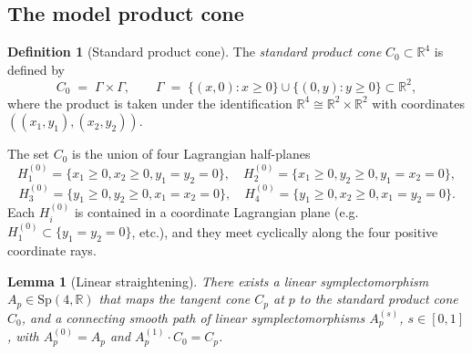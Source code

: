 \documentclass[12pt]{article}
\newtheorem{lemma}[theorem]{Lemma}
\theoremstyle{definition}
\newtheorem{definition}[theorem]{Definition}
\begin{document}
\subsection{The model product cone}

\begin{definition}[Standard product cone]\label{def:product-cone}
The \emph{standard product cone} $C_0\subset\mathbb{R}^4$ is defined by
\begin{equation}\label{eq:product-cone}
C_0 \;=\; \Gamma\times\Gamma, \qquad \Gamma \;=\; \{(x,0):x\geq 0\}\cup\{(0,y):y\geq 0\}\subset\mathbb{R}^2,
\end{equation}
where the product is taken under the identification $\mathbb{R}^4\cong\mathbb{R}^2\times\mathbb{R}^2$ with coordinates $((x_1,y_1),(x_2,y_2))$.
\end{definition}

The set $C_0$ is the union of four Lagrangian half-planes
\[
H_1^{(0)}=\{x_1\geq 0,x_2\geq 0,y_1=y_2=0\},\quad H_2^{(0)}=\{x_1\geq 0,y_2\geq 0,y_1=x_2=0\},
\]
\[
H_3^{(0)}=\{y_1\geq 0,y_2\geq 0,x_1=x_2=0\},\quad H_4^{(0)}=\{y_1\geq 0,x_2\geq 0,x_1=y_2=0\}.
\]
Each $H_i^{(0)}$ is contained in a coordinate Lagrangian plane (e.g.\ $H_1^{(0)}\subset\{y_1=y_2=0\}$, etc.), and they meet cyclically along the four positive coordinate rays.

\begin{lemma}[Linear straightening]\label{lem:straighten}
There exists a linear symplectomorphism $A_p\in\mathrm{Sp}(4,\mathbb{R})$ that maps the tangent cone $C_p$ at $p$ to the standard product cone $C_0$, and a connecting smooth path of linear symplectomorphisms $A_p^{(s)}$, $s\in[0,1]$, with $A_p^{(0)}=A_p$ and $A_p^{(1)}\cdot C_0 = C_p$.
\end{lemma}
\end{document}
